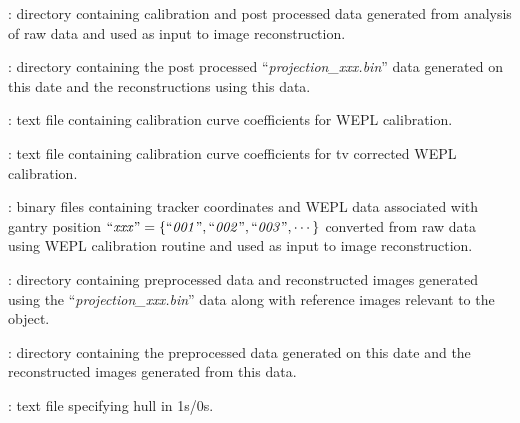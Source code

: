 \documentclass[landscape,12pt]{article}
\begin{document}
\begin{myEnumerate}[labelindent=1pt, leftmargin=*]
\begin{myEnumerate}[labelindent=1pt, leftmargin=*]
\begin{myEnumerate}[labelindent=1pt, leftmargin=*]
\begin{myEnumerate}[labelindent=1pt, leftmargin=*]
\begin{myEnumerate}[labelindent=1pt, leftmargin=*]
                        \item {} \color{Black}: directory containing calibration and post processed data generated from analysis of raw data and used as input to image reconstruction.
                        \begin{myEnumerate}[labelindent=1pt, leftmargin=*]
                            \item {} \color{Black}: directory containing the post processed ``\textit{projection\_xxx.bin}'' data generated on this date and the reconstructions using this data.
                            \begin{myEnumerate}[labelindent=1pt, leftmargin=*]
                                \item {} \color{Black}: text file containing calibration curve coefficients for WEPL calibration.
                                \item {} \color{Black}: text file containing calibration curve coefficients for tv corrected WEPL calibration.
                                \item {} \color{Black}: binary files containing tracker coordinates and WEPL data associated with gantry position $\textrm{``\textit{xxx}''} =\{\textrm{``\textit{001}''}, \textrm{``\textit{002}''}, \textrm{``\textit{003}''}, \cdots\}$ converted from raw data using WEPL calibration routine and used as input to image reconstruction.
                                \item {} \color{Black}: directory containing preprocessed data and reconstructed images generated using the ``\textit{projection\_xxx.bin}'' data along with reference images relevant to the object.
                                \begin{myEnumerate}[labelindent=1pt, leftmargin=*]
                                    \item {} \color{Black}: directory containing the preprocessed data generated on this date and the reconstructed images generated from this data.
                                    \begin{myEnumerate}[labelindent=1pt, leftmargin=*]
                                        \item {} \color{Black}: text file specifying hull in 1s/0s.

\end{myEnumerate}
\end{myEnumerate}
\end{myEnumerate}
\end{myEnumerate}
\end{myEnumerate}
\end{myEnumerate}
\end{myEnumerate}
\end{myEnumerate}
\end{myEnumerate}
\end{document}
